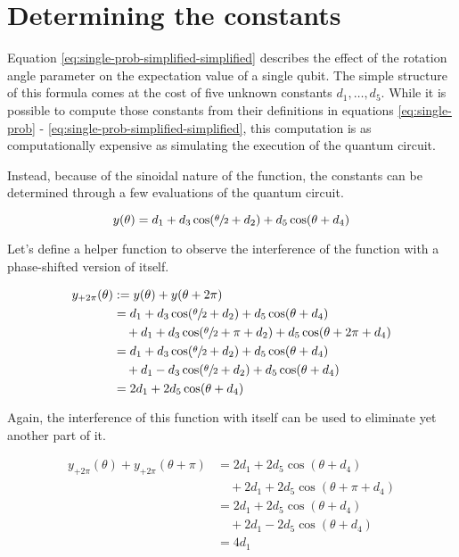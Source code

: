\section{Determining the constants}
Equation \ref{eq:single-prob-simplified-simplified} describes the effect of the
rotation angle parameter on the expectation value of a single qubit.
The simple structure of this formula comes at the cost of five unknown
constants $d_1, \dots, d_5$.
While it is possible to compute those constants from their definitions in
equations \ref{eq:single-prob} - \ref{eq:single-prob-simplified-simplified},
this computation is as computationally expensive as simulating the execution of
the quantum circuit.

Instead, because of the sinoidal nature of the function, the constants can be
determined through a few evaluations of the quantum circuit.

\begin{equation}
    \label{eq:y}
    y(\theta) = d_1 + d_3 \cos(\sfrac\theta2 + d_2) + d_5 \cos(\theta + d_4)
\end{equation}

Let's define a helper function to observe the interference of the function with
a phase-shifted version of itself.

\begin{equation}
    \label{eq:y+2pi}
    \begin{split}
        y_{+2\pi}(\theta) &:= y(\theta) + y(\theta + 2\pi) \\
            &= d_1 + d_3 \cos(\sfrac\theta2 + d_2) + d_5 \cos(\theta + d_4) \\
                &\quad + d_1 + d_3 \cos(\sfrac\theta2 + \pi + d_2) + d_5 \cos(\theta + 2\pi + d_4) \\
            &= d_1 + d_3 \cos(\sfrac\theta2 + d_2) + d_5 \cos(\theta + d_4) \\
                &\quad + d_1 - d_3 \cos(\sfrac\theta2 + d_2) + d_5 \cos(\theta + d_4) \\
            &= 2 d_1 + 2 d_5 \cos(\theta + d_4)
    \end{split}
\end{equation}

Again, the interference of this function with itself can be used to eliminate
yet another part of it.

\begin{equation}
    \label{eq:y+2pi+pi}
    \begin{split}
        y_{+2\pi}(\theta) + y_{+2\pi}(\theta + \pi)
            &= 2 d_1 + 2 d_5 \cos(\theta + d_4) \\
                &\quad + 2 d_1 + 2 d_5 \cos(\theta + \pi + d_4) \\
            &= 2 d_1 + 2 d_5 \cos(\theta + d_4) \\
                &\quad + 2 d_1 - 2 d_5 \cos(\theta + d_4) \\
            &= 4 d_1
    \end{split}
\end{equation}

